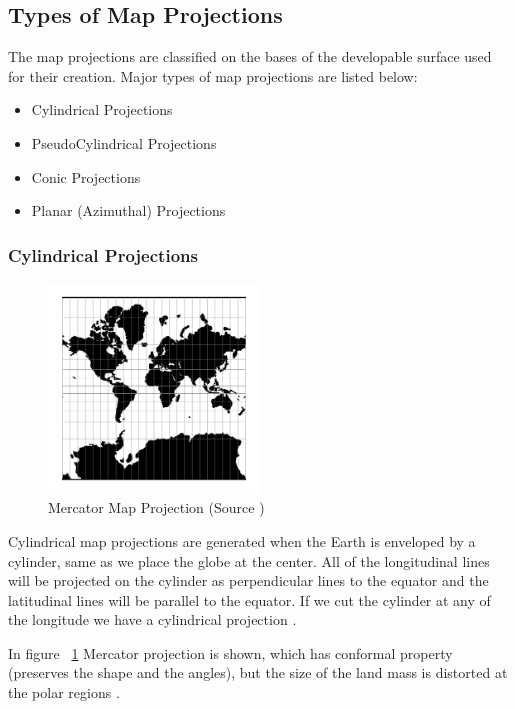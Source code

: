 \subsection{Types of Map Projections}

The map projections are classified on the bases of the developable surface used for their creation. Major types of map projections are listed below:

\begin{itemize}
    \item Cylindrical Projections
    \item PseudoCylindrical Projections
    \item Conic Projections
    \item Planar (Azimuthal) Projections
\end{itemize}

\subsubsection{Cylindrical Projections}
\begin{figure}[H]
    \centering
    \includegraphics[width=0.5\textwidth]{figures/chapter-3/merc.png}
    \caption{Mercator Map Projection (Source \cite{PROJ_SITE})}
    \label{fig:merc}
\end{figure}

Cylindrical map projections are generated when the Earth is enveloped by a cylinder, same as we place the globe at the center. All of the longitudinal lines will be projected on the cylinder as perpendicular lines to the equator and the latitudinal lines  will be parallel to the equator. If we cut the cylinder at any of the longitude we have a cylindrical projection \cite{Snyder1982}.

In figure ~\ref{fig:merc} Mercator projection is shown, which has conformal property (preserves the shape and the angles), but the size of the land mass is distorted at the polar regions \cite{GISGEO_Cylinder}.

